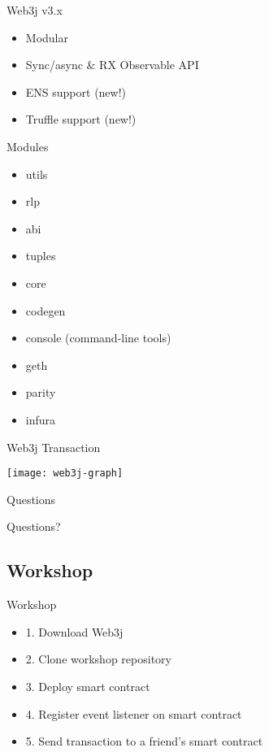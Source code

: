 \documentclass{beamer}
\begin{document}
\begin{frame}{Web3j v3.x}
	\begin{itemize}
		\item {
			Modular
		}
		\item {
			Sync/async \& RX Observable API
		}
		\item {
			ENS support (new!)
		}
		\item {
			Truffle support (new!)
		}
	\end{itemize}
\end{frame}

\begin{frame}{Modules}
	\begin{multicols}{2}
		\begin{itemize}
			\item {
				utils
			}
			\item {
				rlp
			}
			\item {
				abi
			}
			\item {
				tuples
			}	
			\item {
				core
			}
			\item {
				codegen
			}
			\item {
				console (command-line tools)
			}
			\item {
				geth
			}
			\item {
				parity
			}
			\item {
				infura
			}
		\end{itemize}
	\end{multicols}
\end{frame}

\begin{frame}{Web3j Transaction}
	\begin{center}
		\texttt{[image: web3j-graph]}
	\end{center}
\end{frame}

\begin{frame}{Questions}
	\begin{center}
		Questions?
	\end{center}
\end{frame}

\subsection{Workshop}

\begin{frame}{Workshop}
	\begin{itemize}
		\item {
			1. Download Web3j
		}
		\item {
			2. Clone workshop repository
		}
		\item {
			3. Deploy smart contract
		}
		\item {
			4. Register event listener on smart contract
		}
		\item {
			5. Send transaction to a friend's smart contract
		}
	\end{itemize}
\end{frame}
\end{document}
